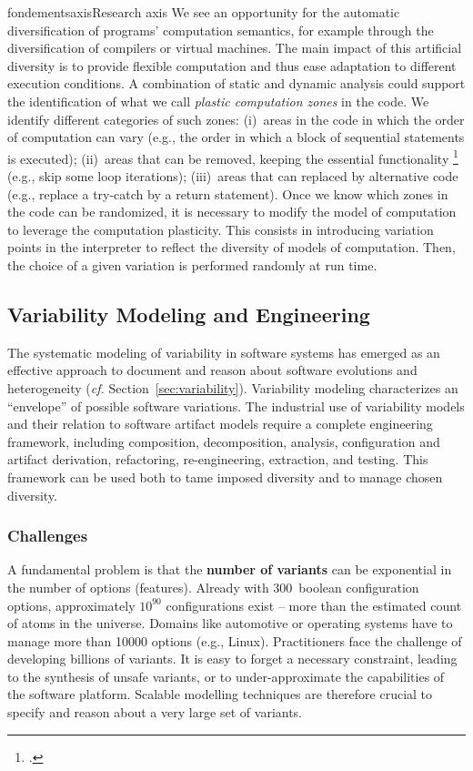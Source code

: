 \documentclass{ra2018}
\begin{document}
\begin{module}{fondements}{axis}{Research axis}
We see an opportunity for the automatic diversification of programs' computation semantics, for example through the diversification of compilers or virtual machines. The main impact of this artificial diversity is to provide flexible computation and thus ease adaptation to different execution conditions. A combination of static and dynamic analysis could support the identification of what we call \emph{plastic computation zones} in the code. We identify different categories of such zones: (i)~areas in the code in which the
order of computation can vary (e.g., the order in which a block of sequential statements is executed); (ii)~areas that can be removed, keeping the essential functionality   \footcite{Sidiroglou-Douskos2011} (e.g., skip some loop iterations); (iii)~areas that can replaced by alternative code (e.g., replace a try-catch by a return statement). Once we know which zones in the code can be randomized, it is necessary to modify the model of computation to leverage the computation plasticity. This consists in introducing variation points in the interpreter
to reflect the diversity of models of computation. Then, the choice of a given variation is performed randomly at run time.



\subsection{Variability Modeling and Engineering}
\label{sec:axis-spl}

The systematic modeling of variability in software systems has emerged as an effective approach to document and reason about software evolutions and heterogeneity (\textit{cf.} Section~\ref{sec:variability}). Variability modeling characterizes an ``envelope'' of possible software variations. The industrial use of variability models and their relation to software artifact models require a complete engineering framework, including composition, decomposition, analysis, configuration and artifact derivation, refactoring, re-engineering, extraction, and testing.  This framework can be used both to tame imposed diversity and to manage chosen diversity.  



\subsubsection*{Challenges} 

A fundamental problem is that the \textbf{number of variants} can be exponential in the number of options (features). 
Already with 300~boolean configuration options, approximately $10^{90}$ configurations exist -- more than the estimated count of atoms in the universe. Domains like automotive or operating systems have to manage more than 10000 options (e.g., Linux). Practitioners face the challenge of developing billions of variants. It is easy to forget a necessary constraint, leading to the synthesis of unsafe variants, or to under-approximate the capabilities of the software platform. Scalable modelling techniques are therefore crucial to specify and reason about a very large set of variants.


\end{module}
\end{document}
